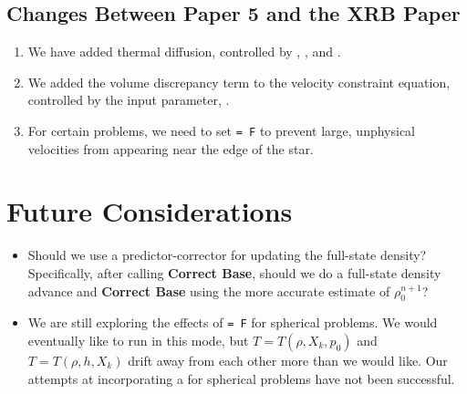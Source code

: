 \subsection{Changes Between Paper 5 and the XRB Paper}
\begin{enumerate}
\item We have added thermal diffusion, controlled by ,
, and .
\item We added the volume discrepancy term to the velocity constraint equation,
controlled by the input parameter, .
\item For certain problems, we need to set  {\tt = F}
to prevent large, unphysical velocities from appearing near the edge of the star.
\end{enumerate}


\section{Future Considerations}

\begin{itemize}
\item Should we use a predictor-corrector for updating the full-state density?
Specifically, after calling {\bf Correct Base}, should we do a full-state density 
advance and {\bf Correct Base} using the more accurate estimate of $\rho_0^{n+1}$?
\item We are still exploring the effects of   {\tt = F} for spherical
problems.  We would eventually like to run in this mode, but $T=T(\rho,X_k,p_0)$ 
and $T=T(\rho,h,X_k)$ drift away from each other more than we would like.  Our
attempts at incorporating a  for spherical problems have not 
been successful.
\end{itemize}

